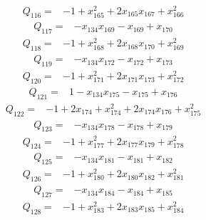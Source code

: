 {\begin{align*}
\end{align*}
\begin{align*}
 Q_{116}={}&-1 +x_{165}^{2} +2x_{165}x_{167} +x_{166}^{2}
\end{align*}
\begin{align*}
 Q_{117}={}&-x_{134}x_{169} -x_{169} +x_{170}
\end{align*}
\begin{align*}
 Q_{118}={}&-1 +x_{168}^{2} +2x_{168}x_{170} +x_{169}^{2}
\end{align*}
\begin{align*}
 Q_{119}={}&-x_{134}x_{172} -x_{172} +x_{173}
\end{align*}
\begin{align*}
 Q_{120}={}&-1 +x_{171}^{2} +2x_{171}x_{173} +x_{172}^{2}
\end{align*}
\begin{align*}
 Q_{121}={}&1 -x_{134}x_{175} -x_{175} +x_{176}
\end{align*}
\begin{align*}
 Q_{122}={}&-1 +2x_{174} +x_{174}^{2} +2x_{174}x_{176} +x_{175}^{2}
\end{align*}
\begin{align*}
 Q_{123}={}&-x_{134}x_{178} -x_{178} +x_{179}
\end{align*}
\begin{align*}
 Q_{124}={}&-1 +x_{177}^{2} +2x_{177}x_{179} +x_{178}^{2}
\end{align*}
\begin{align*}
 Q_{125}={}&-x_{134}x_{181} -x_{181} +x_{182}
\end{align*}
\begin{align*}
 Q_{126}={}&-1 +x_{180}^{2} +2x_{180}x_{182} +x_{181}^{2}
\end{align*}
\begin{align*}
 Q_{127}={}&-x_{134}x_{184} -x_{184} +x_{185}
\end{align*}
\begin{align*}
 Q_{128}={}&-1 +x_{183}^{2} +2x_{183}x_{185} +x_{184}^{2}

\end{align*}}

